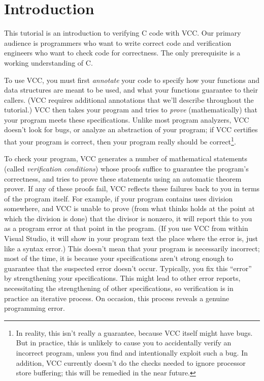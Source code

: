 \section{Introduction}
This tutorial is an introduction to verifying C code with VCC. Our
primary audience is programmers who want to write correct code and
verification engineers who want to check code for correctness. The
only prerequisite is a working understanding of C. 

To use VCC, you must first \emph{annotate} your code to specify how
your functions and data structures are meant to be used, and what your
functions guarantee to their callers. (VCC requires additional
annotations that we'll describe throughout the tutorial.) VCC then
takes your program and tries to \emph{prove} (mathematically) that
your program meets these specifications.  Unlike most program
analyzers, VCC doesn't look for bugs, or analyze an abstraction of
your program; if VCC certifies that your program is correct, then your
program really should be correct\footnote{In reality, this isn't
  really a guarantee, because VCC itself might have bugs. But in
  practice, this is unlikely to cause you to accidentally verify an
  incorrect program, unless you find and intentionally exploit such a
  bug. In addition, VCC currently doesn't do the checks needed to
  ignore processor store buffering; this will be remedied in the near
  future.}. 

To check your program, VCC generates a number of mathematical
statements (called \emph{verification conditions}) whose proofs
suffice to guarantee the program's correctness, and tries to prove
these statements using an automatic theorem prover. If any of these
proofs fail, VCC reflects these failures back to you in terms of the
program itself. For example, if your program contains uses division
somewhere, and VCC is unable to prove (from what thinks holds at the
point at which the division is done) that the divisor is nonzero, it
will report this to you as a program error at that point in the
program. (If you use VCC from within Visual Studio, it will show in
your program text the place where the error is, just like a syntax
error.) This doesn't mean that your program is necessarily incorrect;
most of the time, it is because your specifications aren't strong
enough to guarantee that the suspected error doesn't occur.
Typically, you fix this ``error'' by strengthening your
specifications. This might lead to other error reports, necessitating
the strengthening of other specifications, so verification is in
practice an iterative process.
On occasion, this process reveals a
genuine programming error.


